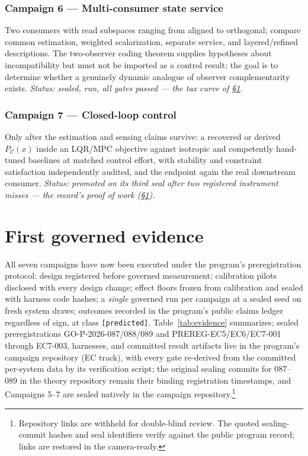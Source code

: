 \documentclass{article}
\theoremstyle{definition}
\theoremstyle{remark}
\newcommand{\PC}{P_{\mathcal{C}}}
\begin{document}
\subsubsection*{Campaign 6 --- Multi-consumer state service}
Two consumers with read subspaces ranging from aligned to orthogonal; compare
common estimation, weighted scalarization, separate service, and
layered/refined descriptions. The two-observer coding theorem supplies
hypotheses about incompatibility but must not be imported as a control
result; the goal is to determine whether a genuinely dynamic analogue of
observer complementarity exists.
\emph{Status: sealed, run, all gates passed --- the tax curve of
\S\ref{sec:evidence}.}

\subsubsection*{Campaign 7 --- Closed-loop control}
Only after the estimation and sensing claims survive: a recovered or derived
$\PC(x)$ inside an LQR/MPC objective against isotropic and competently
hand-tuned baselines at matched control effort, with stability and
constraint satisfaction independently audited, and the endpoint again the
real downstream consumer.
\emph{Status: promoted on its third seal after two registered instrument
misses --- the record's proof of work (\S\ref{sec:evidence}).}

\section{First governed evidence}
\label{sec:evidence}

All seven campaigns have now been executed under the program's
preregistration protocol: design registered before governed measurement;
calibration pilots disclosed with every design change; effect floors frozen
from calibration and sealed with harness code hashes; a \emph{single}
governed run per campaign at a sealed seed on fresh system draws; outcomes
recorded in the program's public claims ledger regardless of sign, at class
\texttt{[predicted]}. Table~\ref{tab:evidence} summarizes; sealed
preregistrations GO-P-2026-087/088/089 and PREREG-EC5/EC6/EC7-001
through EC7-003, harnesses, and committed result artifacts live in the
program's campaign repository (EC
track), with every gate re-derived from the committed per-system data by
its verification script; the original sealing commits for 087--089 in
the theory repository remain their binding registration timestamps, and
Campaigns 5--7 are sealed natively in the campaign
repository.\footnote{Repository links are withheld for double-blind
review. The quoted sealing-commit hashes and seal identifiers verify
against the public program record; links are restored in the
camera-ready.}
\end{document}

